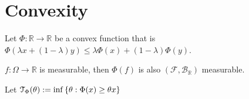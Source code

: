 \section{Convexity}
    Let \(\Phi: \mathbb{R} \to \mathbb{R}\) be a convex function that is \(\Phi(\lambda x + (1 - \lambda)y) \leq \lambda \Phi(x)  + (1 - \lambda) \Phi(y)\). 
    
    \begin{proposition}
        \(f : \Omega\to \mathbb{R}\) is measurable, then \(\Phi(f)\) is also \((\mathcal{F}, \mathcal{B}_{\mathbb{R}}) \) measurable. 
    \end{proposition}
    
    \begin{proposition}
        Let \(\mathcal{T}_{\Phi}(\theta) :=\inf\Bqty{\theta: \Phi(x) \geq \theta x}\)
    \end{proposition}
    